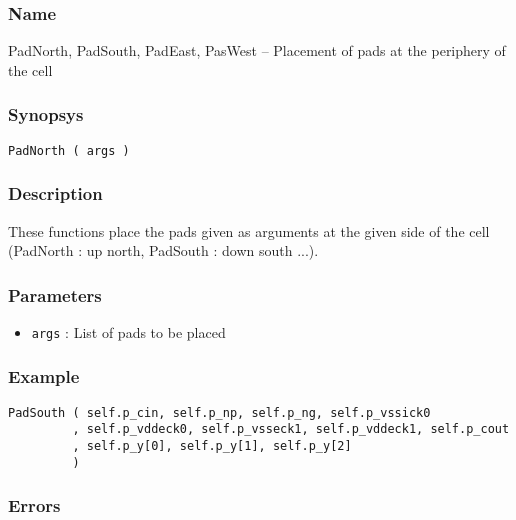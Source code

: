 \subsubsection{Name}

PadNorth, PadSouth, PadEast, PasWest -- Placement of pads at the periphery of the cell

\subsubsection{Synopsys}

\begin{verbatim}
PadNorth ( args )
\end{verbatim}

\subsubsection{Description}

These functions place the pads given as arguments at the given side of the cell (PadNorth : up north, PadSouth : down south ...).
    
\subsubsection{Parameters}

\begin{itemize}
    \item \verb-args- : List of pads to be placed
\end{itemize}

\subsubsection{Example}

\begin{verbatim}
PadSouth ( self.p_cin, self.p_np, self.p_ng, self.p_vssick0
         , self.p_vddeck0, self.p_vsseck1, self.p_vddeck1, self.p_cout
         , self.p_y[0], self.p_y[1], self.p_y[2]
         )
\end{verbatim}

\subsubsection{Errors}

